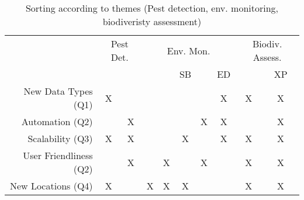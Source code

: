 \begin{table}
    \centering 
    \begin{tabular}{r|cc|ccccc|cc}
        & \multicolumn{2}{c}{Pest Det.} & \multicolumn{5}{c}{Env. Mon.} & \multicolumn{2}{c}{Biodiv. Assess.}  \\
         & \cite{Geckeler2023a} & \cite{Geckeler2024a} &  \cite{Geckeler2022a} & \cite{Geckeler2023b} & SB & \cite{Geckeler2024} & ED & \cite{Kirchgeorg2024} & XP \\
         \hline \hline
         New Data Types (Q1)  & X &   &   &   &   &   & X & X & X\\
         \hline
         Automation (Q2)           &   & X &   &   &   & X & X &   & X\\
         \hline
         Scalability (Q3)          & X & X &   &   & X &   & X &  X & X\\
         \hline
         User Friendliness (Q2)    &   & X &   & X &   & X &   &  X & X\\
         \hline
         New Locations (Q4)        & X &   & X & X & X &   &   &  X & X\\
    \end{tabular}
    \caption{Sorting according to themes (Pest detection, env. monitoring, biodiveristy assessment)}
    \label{tab:my_label}
\end{table}

